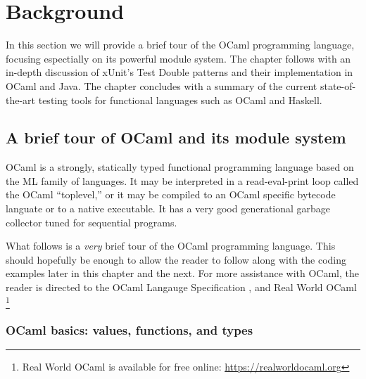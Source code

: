 \chapter{Background}
\label{background}

In this section we will provide a brief tour of the OCaml programming
language, focusing espectially on its powerful module system. The
chapter follows with an in-depth discussion of xUnit's Test Double
patterns and their implementation in OCaml and Java. The chapter
concludes with a summary of the current state-of-the-art testing tools
for functional languages such as OCaml and Haskell.

\section{A brief tour of OCaml and its module system}
\label{ocaml}



OCaml is a strongly, statically typed functional programming language
based on the ML family of languages. It may be interpreted in a
read-eval-print loop called the OCaml ``toplevel,'' or it may be
compiled to an OCaml specific bytecode languate or to a native
executable. \cite{ocaml:spec} It has a very good generational garbage
collector tuned for sequential programs. \cite{ocaml:gc_tutorial}

What follows is a \textit{very} brief tour of the OCaml programming
language. This should hopefully be enough to allow the reader to
follow along with the coding examples later in this chapter and the
next. For more assistance with OCaml, the reader is directed to the
OCaml Langauge Specification \cite{ocaml:spec}, and Real World OCaml
\cite{rwo}\footnote{Real World OCaml is available for free online:
  \url{https://realworldocaml.org}}

\subsection{OCaml basics: values, functions, and types}

